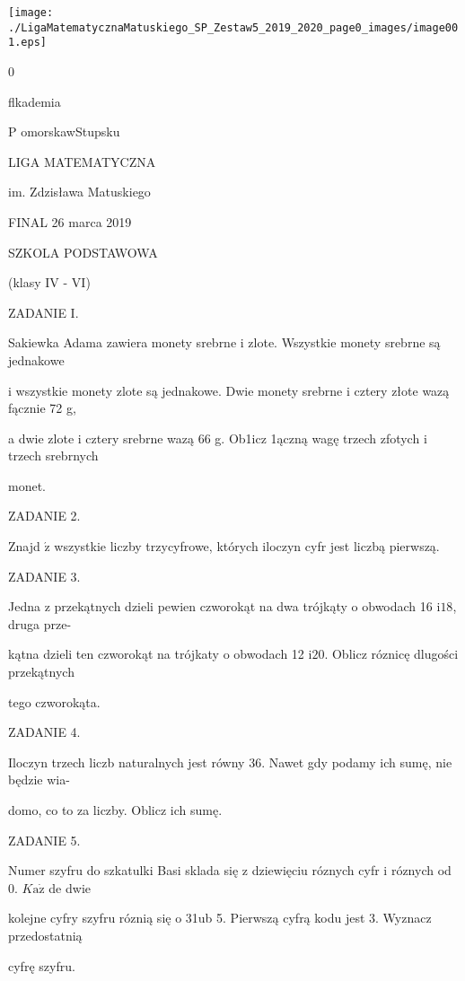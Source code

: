 \documentclass[a4paper,12pt]{article}
\begin{document}
\begin{center}
\texttt{[image: ./LigaMatematycznaMatuskiego\_SP\_Zestaw5\_2019\_2020\_page0\_images/image001.eps]}
\end{center}
0

flkademia

P omorskawStupsku

LIGA MATEMATYCZNA

im. Zdzisława Matuskiego

FINAL 26 marca 2019

SZKOLA PODSTAWOWA

(klasy IV - VI)

ZADANIE I.

Sakiewka Adama zawiera monety srebrne i zlote. Wszystkie monety srebrne są jednakowe

i wszystkie monety zlote są jednakowe. Dwie monety srebrne i cztery złote wazą fącznie 72 g,

a dwie zlote i cztery srebrne wazą 66 g. Ob1icz 1ączną wagę trzech zfotych i trzech srebrnych

monet.

ZADANIE 2.

Znajd $\acute{\mathrm{z}}$ wszystkie liczby trzycyfrowe, których iloczyn cyfr jest liczbą pierwszą.

ZADANIE 3.

Jedna z przekątnych dzieli pewien czworokąt na dwa trójkąty o obwodach 16 $\mathrm{i}18$, druga prze-

kątna dzieli ten czworokąt na trójkaty o obwodach 12 $\mathrm{i}20$. Oblicz róznicę dlugości przekątnych

tego czworokąta.

ZADANIE 4.

Iloczyn trzech liczb naturalnych jest równy 36. Nawet gdy podamy ich sumę, nie będzie wia-

domo, co to za liczby. Oblicz ich sumę.

ZADANIE 5.

Numer szyfru do szkatulki Basi sklada się z dziewięciu róznych cyfr i róznych od 0. $K\mathrm{a}\dot{\mathrm{z}}$ de dwie

kolejne cyfry szyfru róznią się o 31ub 5. Pierwszą cyfrą kodu jest 3. Wyznacz przedostatnią

cyfrę szyfru.
\end{document}
